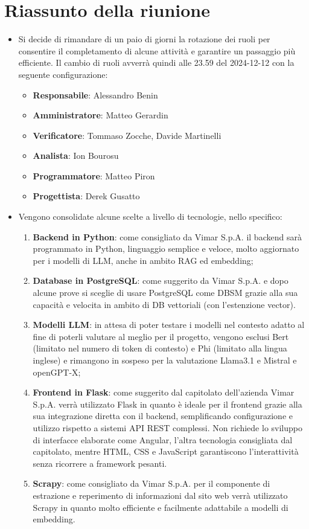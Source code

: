 \section{Riassunto della riunione}
\begin{itemize}
    \item Si decide di rimandare di un paio di giorni la rotazione dei ruoli per consentire il completamento di alcune attività e garantire un passaggio più efficiente. Il cambio di ruoli avverrà quindi alle 23.59 del 2024-12-12 con la seguente configurazione:
    \begin{itemize}
    \item \textbf{Responsabile}: Alessandro Benin 
    \item \textbf{Amministratore}: Matteo Gerardin 
    \item \textbf{Verificatore}: Tommaso Zocche, Davide Martinelli
    \item \textbf{Analista}: Ion Bourosu
    \item \textbf{Programmatore}: Matteo Piron
    \item \textbf{Progettista}: Derek Gusatto
    \end{itemize}
    \item Vengono consolidate alcune scelte a livello di tecnologie, nello specifico:
    \begin{enumerate}
        \item \textbf{Backend in Python}: come consigliato da Vimar S.p.A. il backend sarà programmato in Python, linguaggio semplice e veloce, molto aggiornato per i modelli di LLM, anche in ambito RAG ed embedding;
        \item \textbf{Database in PostgreSQL}: come suggerito da Vimar S.p.A. e dopo alcune prove si sceglie di usare PostgreSQL come DBSM grazie alla sua capacità e velocita in ambito di DB vettoriali (con l'estenzione vector).
        \item \textbf{Modelli LLM}: in attesa di poter testare i modelli nel contesto adatto al fine di poterli valutare al meglio per il progetto, vengono esclusi Bert (limitato nel numero di token di contesto) e Phi (limitato alla lingua inglese) e rimangono in sospeso per la valutazione Llama3.1 e Mistral e openGPT-X;
        \item \textbf{Frontend in Flask}: come suggerito dal capitolato dell'azienda Vimar S.p.A. verrà utilizzato Flask in quanto è ideale per il frontend grazie alla sua integrazione diretta con il backend, semplificando configurazione e utilizzo rispetto a sistemi API REST complessi. Non richiede lo sviluppo di interfacce elaborate come Angular, l'altra tecnologia consigliata dal capitolato, mentre HTML, CSS e JavaScript garantiscono l'interattività senza ricorrere a framework pesanti.
        \item \textbf{Scrapy}: come consigliato da Vimar S.p.A. per il componente di estrazione e reperimento di informazioni dal sito web verrà utilizzato Scrapy in quanto molto efficiente e facilmente adattabile a modelli di embedding.
    \end{enumerate}   
\end{itemize}